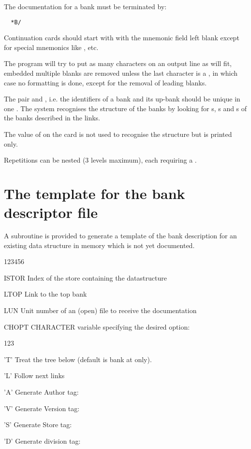 The documentation for a bank must be terminated by:
\begin{verbatim}
  *B/
\end{verbatim}
 
\begin{Notes}
\item Continuation cards should start with  with the mnemonic field
      left blank except for special mnemonics like , 
       etc.
\item The program will try to put as many characters on an output line as
      will fit, embedded multiple blanks are removed unless the last 
      character is a , in
      which case no formatting is done, except for the removal of leading blanks.
\item The pair  and , i.e. the identifiers of a bank and
      its up-bank should be unique in one \RZfile. 
      The system recognises the structure of the banks by looking for 
      s, s and s of the banks described in the links. 
\item The value of  on the card 
      is not used to recognise the structure but is printed only.
\item Repetitions can be nested (3 levels maximum), 
      each  requiring a .
\end{Notes}
 
\section{The template for the bank descriptor file}
\label{sec:dzdocdzdtmp}  
 
A subroutine is provided to generate a template of the bank
description for an existing
data structure in memory which is not yet documented.
 
 
\Idesc
\begin{DLtt}{123456}
\item[ISTOR] Index of the store containing the datastructure
\item[LTOP]  Link to the top bank
\item[LUN]   Unit number of an (open) file to receive the documentation
\item[CHOPT] CHARACTER variable specifying the desired option:
\begin{DLtt}{123}
\item['T'] Treat the tree below  
           (default is bank at  only).
\item['L'] Follow next links
\item['A'] Generate Author tag: 
\item['V'] Generate Version tag: 
\item['S'] Generate Store tag:   
\item['D'] Generate division tag: 
\end{DLtt} 
\end{DLtt} 
 
